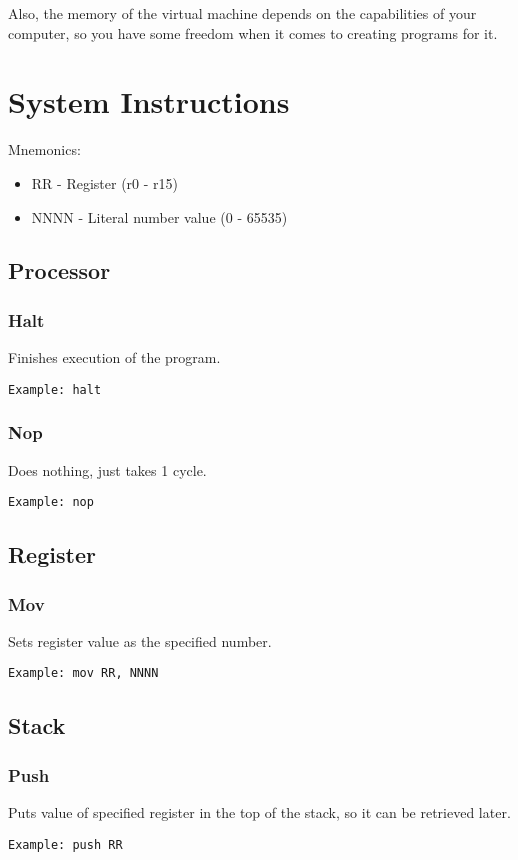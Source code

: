 \documentclass[oneside]{book}
\begin{document}
Also, the memory of the virtual machine depends on the capabilities of your computer, so you have some freedom when it comes to creating programs for it.


\chapter{System Instructions}
Mnemonics: 
\begin{itemize}
	\item RR - Register (r0 - r15)
	\item NNNN - Literal number value (0 - 65535)
\end{itemize}

  \section{Processor}

  \subsection{Halt}
Finishes execution of the program.
\begin{Verbatim}
Example: halt
\end{Verbatim}

  \subsection{Nop}
Does nothing, just takes 1 cycle.
\begin{Verbatim}
Example: nop
\end{Verbatim}

  \section{Register}

 \subsection{Mov}
Sets register value as the specified number.
\begin{Verbatim}
Example: mov RR, NNNN
\end{Verbatim}

  \section{Stack}

 \subsection{Push}
Puts value of specified register in the top of the stack, so it can be retrieved later.
\begin{Verbatim}
Example: push RR
\end{Verbatim}
\end{document}
